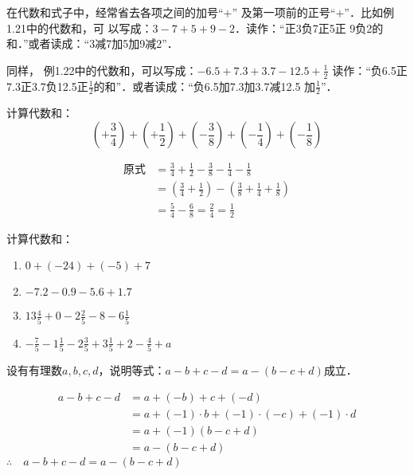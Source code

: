 在代数和式子中，经常省去各项之间的加号“$+$”
及第一项前的正号“$+$”．比如例1.21中的代数和，可
以写成：$3-7+5+9-2$．读作：“正3负7正5正
9负2的和．”或者读成：“3减7加5加9减2”．

同样，
例1.22中的代数和，可以写成：$-6.5+7.3+3.7-12.5+\frac{1}{2}$
读作：“负6.5正7.3正3.7负12.5正$\frac{1}{2}$的和”．或者读成：“负6.5加7.3加3.7减12.5
加$\frac{1}{2}$”．




\begin{example}
	计算代数和：
	\[\left(+\frac{3}{4}\right)+\left(+\frac{1}{2}\right)+\left(-\frac{3}{8}\right)+\left(-\frac{1}{4}\right)+\left(-\frac{1}{8}\right)  \]   
\end{example}


\begin{solution}
	\begin{align*}
	\text{原式}&=\frac{3}{4}+\frac{1}{2}-\frac{3}{8}-\frac{1}{4}-\frac{1}{8}  \tag{简化代数和}\\
	&=\left(\frac{3}{4}+\frac{1}{2}\right)-\left(\frac{3}{8}+\frac{1}{4}+\frac{1}{8}\right)\\
	&=\frac{5}{4}-\frac{6}{8}=\frac{2}{4}=\frac{1}{2}
	\end{align*}  
\end{solution}

\begin{ex}
	计算代数和：
	\begin{enumerate}
		\item $0+(-24)+(-5)+7$
		\item $-7.2-0.9-5.6+1.7$
		\item $13\frac{4}{5}+0-2\frac{2}{5}-8-6\frac{1}{5}$
		\item $-\frac{7}{5}-1\frac{1}{5}-2\frac{3}{5}+3\frac{1}{5}+2-\frac{4}{5}+a$
	\end{enumerate} 
\end{ex}

\begin{example}
	设有有理数$a,b,c,d$，说明等式：$a-b+c-d=a-(b-c+d)$成立．
\end{example}

\begin{solution}
	\begin{align*}
	a-b+c-d&= a+(-b)+c+(-d) \tag{代数和原意}\\
	&=a+ (-1)\cdot b+(-1)\cdot (-c)+(-1)\cdot d  \tag{相反数意义}\\
	&=a+(-1)(b-c+d) \tag{分配律}\\
	&=a-(b-c+d)  \tag{相反数意义}    
	\end{align*}    
	$\therefore\quad a-b+c-d=a-(b-c+d)$
\end{solution}


